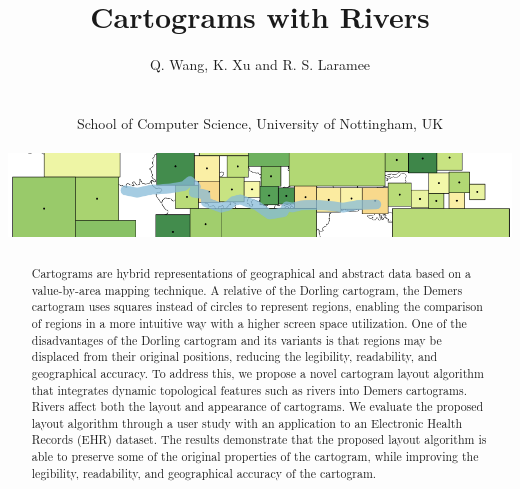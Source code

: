 \documentclass{egpubl}
\begin{document}
\author[Q. Wang, K. Xu \& R. S. Laramee]
{
    \parbox{\textwidth}{\centering Q. Wang, K. Xu and R. S. Laramee}
    \\
    \parbox{\textwidth}{\centering School of Computer Science, University of Nottingham, UK \\ \begin{center}
            \vspace{2em}
            \includegraphics[width=\textwidth,keepaspectratio]{figure/cover.png}
        \end{center}
    }
}

\title{Cartograms with Rivers}

\pagestyle{plain}

\maketitle

\begin{abstract}
    Cartograms are hybrid representations of geographical and abstract data based on a value-by-area mapping technique. A relative of the Dorling cartogram, the Demers cartogram uses squares instead of circles to represent regions, enabling the comparison of regions in a more intuitive way with a higher screen space utilization. One of the disadvantages of the Dorling cartogram and its variants is that regions may be displaced from their original positions, reducing the legibility, readability, and geographical accuracy. To address this, we propose a novel cartogram layout algorithm that integrates dynamic topological features such as rivers into Demers cartograms. Rivers affect both the layout and appearance of cartograms. We evaluate the proposed layout algorithm through a user study with an application to an Electronic Health Records (EHR) dataset. The results demonstrate that the proposed layout algorithm is able to preserve some of the original properties of the cartogram, while improving the legibility, readability, and geographical accuracy of the cartogram.
\end{abstract}


\end{document}
